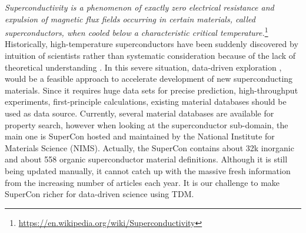 \documentclass{article}[a4]
\begin{document}
\textit{Superconductivity is a phenomenon of exactly zero electrical resistance and expulsion of magnetic flux fields occurring in certain materials, called superconductors, when cooled below a characteristic critical temperature.}\footnote{\url{https://en.wikipedia.org/wiki/Superconductivity}}
Historically, high-temperature superconductors have been suddenly discovered by intuition of scientists rather than systematic consideration because of the lack of theoretical understanding \cite{klintenberg2013possible} \cite{DBLP:journals/corr/abs-1812-01995}. In this severe situation, data-driven exploration \cite{doi:10.1080/14686996.2018.1548885}, \cite{HAMIDIEH2018346} \cite{PhysRevMaterials.2.024802} \cite{doi:10.1021/cm503507h} would be a feasible approach to accelerate development of new superconducting materials. Since it requires huge data sets for precise prediction, high-throughput experiments, first-principle calculations, existing material databases should be used as data source. Currently, several material databases are available for property search, however when looking at the superconductor sub-domain, the main one is SuperCon\cite{SuperCon} hosted and maintained by the National Institute for Materials Science (NIMS). Actually, the SuperCon contains about 32k inorganic and about 558 organic superconductor material definitions. Although it is still being updated manually, it cannot catch up with the massive fresh information from the increasing number of articles each year. It is our challenge to make SuperCon richer for data-driven science using TDM.


\end{document}
